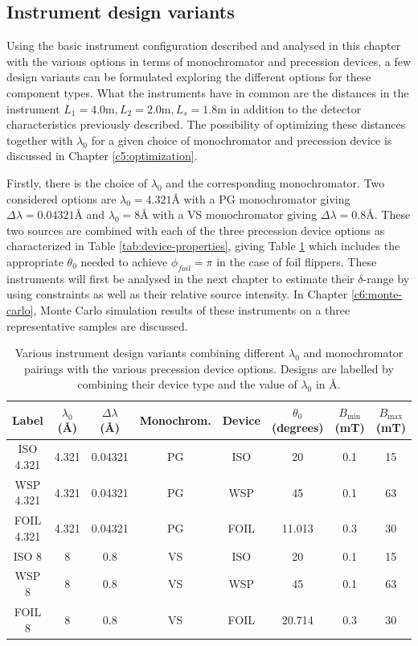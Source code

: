 \documentclass{article}
\begin{document}
\subsection{Instrument design variants}
\label{c3.7}
Using the basic instrument configuration described and analysed in this chapter with the various options in terms of monochromator and precession devices, a few design variants can be formulated exploring the different options for these component types. What the instruments have in common are the distances in the instrument $L_1 = 4.0\unit{\meter}, L_2 = 2.0\unit{\meter}, L_s = 1.8\unit{\meter}$ in addition to the detector characteristics previously described. The possibility of optimizing these distances together with $\lambda_0$ for a given choice of monochromator and precession device is discussed in Chapter \ref{c5:optimization}.  

Firstly, there is the choice of $\lambda_0$ and the corresponding monochromator. Two considered options are $\lambda_0 = 4.321$Å with a PG monochromator giving $\Delta\lambda = 0.04321$Å and $\lambda_0 = 8$Å with a VS monochromator giving $\Delta\lambda = 0.8$Å. These two sources are combined with each of the three precession device options as characterized in Table \ref{tab:device-properties}, giving Table \ref{tab:design-variants} which includes the appropriate $\theta_0$ needed to achieve $\phi_{foil} = \pi$ in the case of foil flippers. These instruments will first be analysed in the next chapter to estimate their $\delta$-range by using constraints as well as their relative source intensity. In Chapter \ref{c6:monte-carlo}, Monte Carlo simulation results of these instruments on a three representative samples are discussed. 

\begin{table}[h!]
	\centering
	\begin{tabular}{|c|c|c|c|c|c|c|c|}
		\hline
		Label & $\lambda_0$ (Å) & $\Delta\lambda$ (Å) & Monochrom. & Device & $\theta_0$ (degrees) & $B_{\text{min}}$ (mT) & $B_{\text{max}}$ (mT) \\
		\hline
		ISO 4.321 & 4.321 & 0.04321 & PG & ISO & 20 & 0.1 & 15 \\
		WSP 4.321 & 4.321 & 0.04321 & PG & WSP & 45 & 0.1 & 63 \\
		FOIL 4.321 & 4.321 & 0.04321 & PG & FOIL & 11.013 & 0.3 & 30 \\
		ISO 8 & 8 & 0.8 & VS & ISO & 20 & 0.1 & 15 \\
		WSP 8 & 8 & 0.8 & VS & WSP & 45 & 0.1 & 63 \\
		FOIL 8 & 8 & 0.8 & VS & FOIL & 20.714 & 0.3 & 30 \\
		\hline
	\end{tabular}
	\caption{Various instrument design variants combining different $\lambda_0$ and monochromator pairings with the various precession device options. Designs are labelled by combining their device type and the value of $\lambda_0$ in Å.}
	\label{tab:design-variants}
\end{table}
\end{document}
